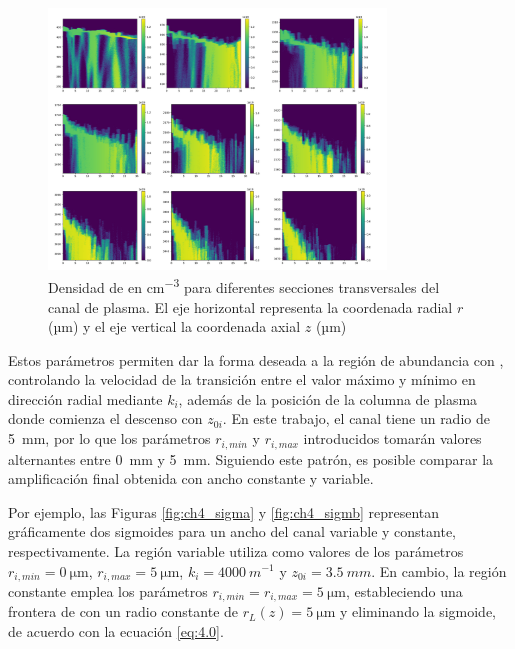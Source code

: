 \begin{figure}[htbp]
  \centering
  \includegraphics[width=0.8\textwidth]{Figuras/ch4_ionkr8.png}
  \caption{Densidad de  en \unit{cm^{-3}} para diferentes secciones transversales del canal de plasma. El eje horizontal representa la coordenada radial $r$ (\unit{µm}) y el eje vertical la coordenada axial $z$ (\unit{µm})}
  \label{fig:4.2}
\end{figure}

Estos parámetros permiten dar la forma deseada a la región de abundancia con , controlando la velocidad de la transición entre el valor máximo y mínimo en dirección radial mediante $k_{i}$, además de la posición de la columna de plasma donde comienza el descenso con $z_{0i}$. En este trabajo, el canal tiene un radio de \qty{5}{mm}, por lo que los parámetros $r_{i,min}$ y $r_{i,max}$ introducidos tomarán valores alternantes entre \qty{0}{mm} y \qty{5}{mm}. Siguiendo este patrón, es posible comparar la amplificación final obtenida con ancho constante y variable.

Por ejemplo, las Figuras \ref{fig:ch4_sigma} y \ref{fig:ch4_sigmb} representan gráficamente dos sigmoides para un ancho del canal variable y constante, respectivamente. La región variable utiliza como valores de los parámetros $r_{i,min}=\qty{0}{\um}$, $r_{i,max}=\qty{5}{\um}$, $k_{i}=\qty{4000}{m^{-1}}$ y $z_{0i}=\qty{3.5}{mm}$. En cambio, la región constante emplea los parámetros $r_{i,min}=r_{i,max}=\qty{5}{\um}$, estableciendo una frontera de  con un radio constante de $r_{L}(z)=\qty{5}{\um}$ y eliminando la sigmoide, de acuerdo con la ecuación \eqref{eq:4.0}.

